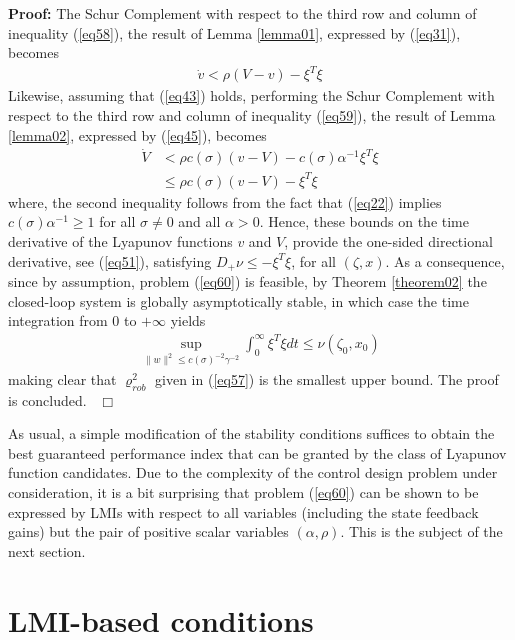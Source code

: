 \documentclass[twocolumn]{autarc_LH}
\newenvironment{proof}{\begin{trivlist} \item[{ \bf Proof:}] }
{~\hfill$\Box$ \end{trivlist} }
\begin{document}
\begin{proof} The Schur Complement with respect to the third row and column of inequality (\ref{eq58}), the result of Lemma \ref{lemma01}, expressed by (\ref{eq31}), becomes 
\begin{align}
		\label{eq61}   \dot v < \rho(V - v) - \xi^T \xi
\end{align}
Likewise, assuming that (\ref{eq43}) holds, performing the Schur Complement with respect to the third row and column of inequality (\ref{eq59}), the result of Lemma \ref{lemma02}, expressed by (\ref{eq45}), becomes 
\begin{align}
		\label{eq62}   \dot V & < \rho c(\sigma)(v - V) - c(\sigma) \alpha^{-1} \xi^T \xi \nonumber \\
  & \leq \rho c(\sigma)(v - V) - \xi^T \xi
\end{align}
where, the second inequality follows from the fact that (\ref{eq22}) implies $c(\sigma) \alpha^{-1} \geq 1$ for all $\sigma \neq 0$ and all $\alpha >0$. Hence, these bounds on the time derivative of the Lyapunov functions $v$ and $V$, provide the one-sided directional derivative, see (\ref{eq51}), satisfying $D_+ \nu \leq - \xi^T \xi$, for all $(\zeta, x)$. As a consequence, since by assumption, problem (\ref{eq60}) is feasible, by Theorem \ref{theorem02} the closed-loop system is globally asymptotically stable, in which case the time integration from $0$ to $+\infty$ yields 
\begin{align} 
\label{e63}  \sup_{\|w\|^2 \leq c(\sigma)^{-2} \gamma^{-2}} \int_0^\infty \xi^T \xi dt \leq \nu(\zeta_0, x_0)
\end{align}
making clear that $\varrho_{rob}^2$ given in (\ref{eq57}) is the smallest upper bound. The proof is concluded. 
\end{proof}

As usual, a simple modification of the stability conditions suffices to obtain the best guaranteed performance index that can be granted by the class of Lyapunov function candidates. Due to the complexity of the control design problem under consideration, it is a bit surprising that problem (\ref{eq60}) can be shown to be expressed by LMIs with respect to all variables (including the state feedback gains) but the pair of positive scalar variables $(\alpha, \rho)$. This is the subject of the next section. 

\section{LMI-based conditions}
\end{document}
